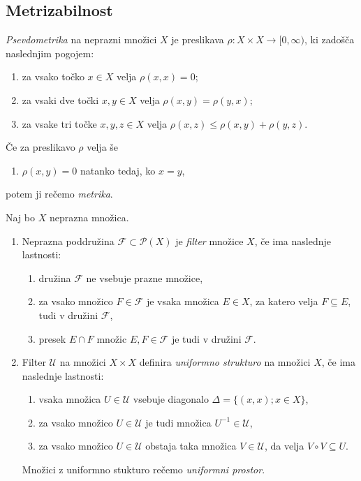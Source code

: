 \documentclass[mat1]{fmfdelo}
\begin{document}
\subsection{Metrizabilnost}

\begin{definicija}\label{def:metrika}
	\emph{Psevdometrika} na neprazni množici $X$ je preslikava $\rho\colon X \times X \to  [0, \infty)$, ki zadošča naslednjim pogojem:
	\begin{enumerate}
		\item za vsako točko $x \in X$ velja $\rho (x, x) = 0$;
		\item za vsaki dve točki $x, y \in X$ velja $\rho (x, y) = \rho (y, x)$;
		\item za vsake tri točke $x, y, z \in X$ velja $\rho (x, z) \leq \rho (x, y) + \rho (y, z)$.
	\end{enumerate}
	Če za preslikavo $\rho$ velja še
	\begin{enumerate}[resume]
		\item $\rho(x,y) = 0$ natanko tedaj, ko $x = y$,
	\end{enumerate}
	potem ji rečemo \emph{metrika}.
\end{definicija}

\begin{definicija}\label{def:uniform}
Naj bo $X$ neprazna množica.
\begin{enumerate}
\item Neprazna poddružina $\mathcal{F} \subset \mathcal{P}(X)$ je \emph{filter} množice $X$, če ima naslednje lastnosti:
\begin{enumerate}
\item družina $\mathcal{F}$ ne vsebuje prazne množice,
\item za vsako množico $F \in \mathcal{F}$ je vsaka množica $E \in X$, za katero velja $F \subseteq E$, tudi v družini $\mathcal{F}$,
\item presek $E \cap F$ množic $E, F \in \mathcal{F}$ je tudi v družini $\mathcal{F}$.
\end{enumerate}
\item Filter $\mathcal{U}$ na množici $X \times X$ definira \emph{uniformno strukturo} na množici $X$, če ima naslednje lastnosti:
\begin{enumerate}
\item vsaka množica $U \in \mathcal{U}$ vsebuje diagonalo $\Delta = \lbrace (x, x) ; x \in X \rbrace$,
\item za vsako množico $U \in \mathcal{U}$ je tudi množica $U^{-1} \in \mathcal{U}$,
\item za vsako množico $U \in \mathcal{U}$ obstaja taka množica $V \in \mathcal{U}$, da velja $V \circ V \subseteq U$.
\end{enumerate}
Množici z uniformno stukturo rečemo \emph{uniformni prostor}.
\end{enumerate}
\end{definicija}
\end{document}
